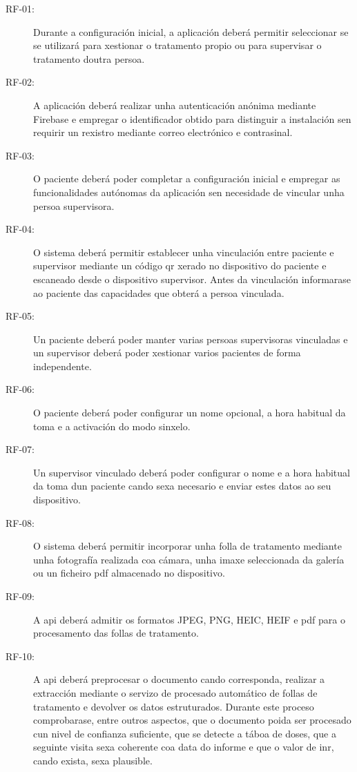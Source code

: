 \begin{description}


\item[RF-01:] Durante a configuración inicial, a aplicación deberá permitir seleccionar se se utilizará para xestionar o tratamento propio ou para supervisar o tratamento doutra persoa.

\item[RF-02:] A aplicación deberá realizar unha autenticación anónima mediante Firebase e empregar o identificador obtido para distinguir a instalación sen requirir un rexistro mediante correo electrónico e contrasinal.

\item[RF-03:] O paciente deberá poder completar a configuración inicial e empregar as funcionalidades autónomas da aplicación sen necesidade de vincular unha persoa supervisora.

\item[RF-04:] O sistema deberá permitir establecer unha vinculación entre paciente e supervisor mediante un código \gls{qr} xerado no dispositivo do paciente e escaneado desde o dispositivo supervisor. Antes da vinculación informarase ao paciente das capacidades que obterá a persoa vinculada.

\item[RF-05:] Un paciente deberá poder manter varias persoas supervisoras vinculadas e un supervisor deberá poder xestionar varios pacientes de forma independente.

\item[RF-06:] O paciente deberá poder configurar un nome opcional, a hora habitual da toma e a activación do modo sinxelo.

\item[RF-07:] Un supervisor vinculado deberá poder configurar o nome e a hora habitual da toma dun paciente cando sexa necesario e enviar estes datos ao seu dispositivo.

\item[RF-08:] O sistema deberá permitir incorporar unha folla de tratamento mediante unha fotografía realizada coa cámara, unha imaxe seleccionada da galería ou un ficheiro \gls{pdf} almacenado no dispositivo.

\item[RF-09:] A \gls{api} deberá admitir os formatos JPEG, PNG, HEIC, HEIF e \gls{pdf} para o procesamento das follas de tratamento.

\item[RF-10:] A \gls{api} deberá preprocesar o documento cando corresponda, realizar a extracción mediante o servizo de procesado automático de follas de tratamento e devolver os datos estruturados. Durante este proceso comprobarase, entre outros aspectos, que o documento poida ser procesado cun nivel de confianza suficiente, que se detecte a táboa de doses, que a seguinte visita sexa coherente coa data do informe e que o valor de \gls{inr}, cando exista, sexa plausible.


\end{description}
